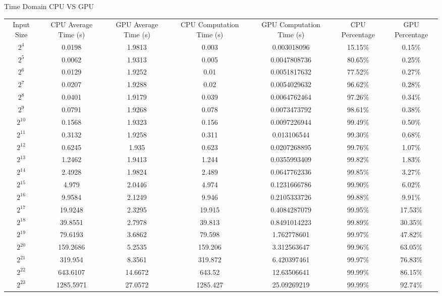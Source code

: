 \begin{center}
\begin{landscape}
    Time Domain CPU VS GPU
    \begin{tabular}{c|c|c|c|c|c|c}
         Input Size & CPU Average Time (s) & GPU Average Time (s) & CPU Computation Time (s) & GPU Computation Time (s) & CPU Percentage & GPU Percentage \\
         $2^4$ & 0.0198 & 1.9813 & 0.003 & 0.003018096 & 15.15\% & 0.15\% \\
        $2^5$ & 0.0062 & 1.9313 & 0.005 & 0.0047808736 & 80.65\% & 0.25\% \\
        $2^6$ & 0.0129 & 1.9252 & 0.01 & 0.0051817632 & 77.52\% & 0.27\% \\
        $2^7$ & 0.0207 & 1.9288 & 0.02 & 0.0054029632 & 96.62\% & 0.28\% \\
        $2^8$ & 0.0401 & 1.9179 & 0.039 & 0.0064762464 & 97.26\% & 0.34\% \\
        $2^9$ & 0.0791 & 1.9268 & 0.078 & 0.0073473792 & 98.61\% & 0.38\% \\
        $2^{10}$ & 0.1568 & 1.9323 & 0.156 & 0.0097226944 & 99.49\% & 0.50\% \\
        $2^{11}$ & 0.3132 & 1.9258 & 0.311 & 0.013106544 & 99.30\% & 0.68\% \\
        $2^{12}$ & 0.6245 & 1.935 & 0.623 & 0.0207268895 & 99.76\% & 1.07\% \\
        $2^{13}$ & 1.2462 & 1.9413 & 1.244 & 0.0355993409 & 99.82\% & 1.83\% \\
        $2^{14}$ & 2.4928 & 1.9824 & 2.489 & 0.0647762336 & 99.85\% & 3.27\% \\
        $2^{15}$ & 4.979 & 2.0446 & 4.974 & 0.1231666786 & 99.90\% & 6.02\% \\
        $2^{16}$ & 9.9584 & 2.1249 & 9.946 & 0.2105333726 & 99.88\% & 9.91\% \\
        $2^{17}$ & 19.9248 & 2.3295 & 19.915 & 0.4084287079 & 99.95\% & 17.53\% \\
        $2^{18}$ & 39.8551 & 2.7978 & 39.813 & 0.8491014223 & 99.89\% & 30.35\% \\
        $2^{19}$ & 79.6193 & 3.6862 & 79.598 & 1.762778601 & 99.97\% & 47.82\% \\
        $2^{20}$ & 159.2686 & 5.2535 & 159.206 & 3.312563647 & 99.96\% & 63.05\% \\
        $2^{21}$ & 319.954 & 8.3561 & 319.872 & 6.420397461 & 99.97\% & 76.83\% \\
        $2^{22}$ & 643.6107 & 14.6672 & 643.52 & 12.63506641 & 99.99\% & 86.15\% \\
        $2^{23}$ & 1285.5971 & 27.0572 & 1285.427 & 25.09269219 & 99.99\% & 92.74\% \\

\end{tabular}
\end{landscape}
\end{center}
